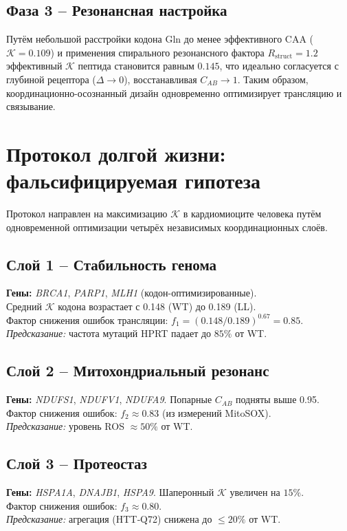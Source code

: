 \documentclass[12pt,a4paper]{article}
\newcommand{\REL}{\mathcal{K}}          %
\begin{document}
	\subsection{Фаза 3 – Резонансная настройка}
	Путём небольшой расстройки кодона Gln до менее эффективного CAA (\(\REL=0.109\)) и применения спирального резонансного фактора \(R_{\mathrm{struct}}=1.2\) эффективный \(\REL\) пептида становится равным \(0.145\), что идеально согласуется с глубиной рецептора (\(\Delta \to 0\)), восстанавливая \(C_{AB} \to 1\). Таким образом, координационно-осознанный дизайн одновременно оптимизирует трансляцию и связывание.
	
	\section{Протокол долгой жизни: фальсифицируемая гипотеза}
	\label{sec:LL}
	Протокол направлен на максимизацию \(\REL\) в кардиомиоците человека путём одновременной оптимизации четырёх независимых координационных слоёв.
	
	\subsection{Слой 1 – Стабильность генома}
	\textbf{Гены:} \emph{BRCA1}, \emph{PARP1}, \emph{MLH1} (кодон-оптимизированные). \\
	Средний \(\REL\) кодона возрастает с 0.148 (WT) до 0.189 (LL). \\
	Фактор снижения ошибок трансляции: \(f_1 = (0.148/0.189)^{0.67} = 0.85\). \\
	\textit{Предсказание:} частота мутаций HPRT падает до \(85\%\) от WT.
	
	\subsection{Слой 2 – Митохондриальный резонанс}
	\textbf{Гены:} \emph{NDUFS1}, \emph{NDUFV1}, \emph{NDUFA9}. Попарные \(C_{AB}\) подняты выше 0.95. \\
	Фактор снижения ошибок: \(f_2 \approx 0.83\) (из измерений MitoSOX). \\
	\textit{Предсказание:} уровень ROS \(\approx 50\%\) от WT.
	
	\subsection{Слой 3 – Протеостаз}
	\textbf{Гены:} \emph{HSPA1A}, \emph{DNAJB1}, \emph{HSPA9}. Шаперонный \(\REL\) увеличен на \(15\%\). \\
	Фактор снижения ошибок: \(f_3 \approx 0.80\). \\
	\textit{Предсказание:} агрегация (HTT‑Q72) снижена до \(\le 20\%\) от WT.
	
\end{document}
